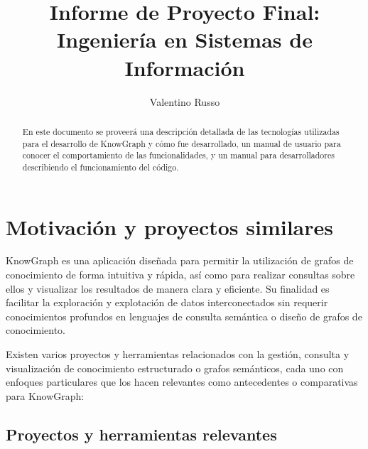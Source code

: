 \documentclass{article}
\title{Informe de Proyecto Final:
Ingeniería en Sistemas de Información}
\author{Valentino Russo}
\begin{document}
\maketitle
\begin{abstract}
En este documento se proveerá una descripción detallada de las tecnologías utilizadas para el desarrollo de KnowGraph y cómo fue desarrollado, un manual de usuario para conocer el comportamiento de las funcionalidades, y un manual para desarrolladores describiendo el funcionamiento del código.
\end{abstract}

\section{Motivación y proyectos similares}

KnowGraph es una aplicación diseñada para permitir la utilización de grafos de conocimiento de forma intuitiva y rápida, así como para realizar consultas sobre ellos y visualizar los resultados de manera clara y eficiente. Su finalidad es facilitar la exploración y explotación de datos interconectados sin requerir conocimientos profundos en lenguajes de consulta semántica o diseño de grafos de conocimiento.

Existen varios proyectos y herramientas relacionados con la gestión, consulta y visualización de conocimiento estructurado o grafos semánticos, cada uno con enfoques particulares que los hacen relevantes como antecedentes o comparativas para KnowGraph:

\subsection{Proyectos y herramientas relevantes}
\end{document}
